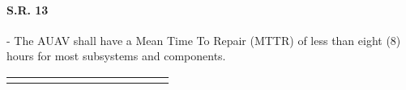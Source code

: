 \begin{fullwidth}
\begin{landscape}
    \newpage
    
    
    \paragraph{S.R. 13} - The AUAV shall have a Mean Time To Repair (MTTR) of less than eight (8) hours for most subsystems and components.
    
    {\fontsize{10pt}{11pt}\selectfont
    \begin{longtable}{| L{0.12\linewidth} | L{0.16\linewidth} |  L{0.20\linewidth} | L{0.08\linewidth} | L{0.20\linewidth} | L{0.08\linewidth} |}
        \hline \endlastfoot
        

\end{longtable}}
\end{landscape}
\end{fullwidth}
